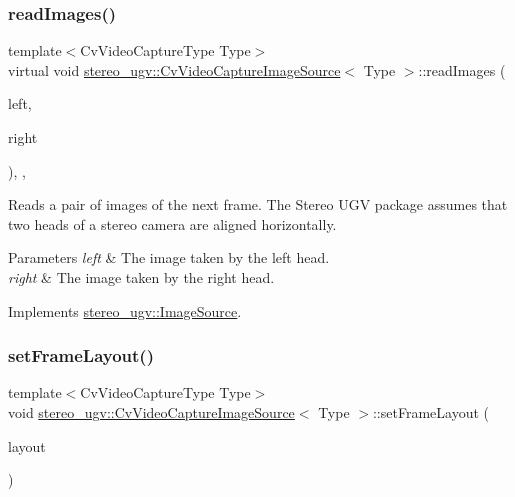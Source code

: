 \subsubsection{\texorpdfstring{read\+Images()}{readImages()}}
{\footnotesize\ttfamily template$<$Cv\+Video\+Capture\+Type Type$>$ \\
virtual void \hyperlink{classstereo__ugv_1_1CvVideoCaptureImageSource}{stereo\+\_\+ugv\+::\+Cv\+Video\+Capture\+Image\+Source}$<$ Type $>$\+::read\+Images (\begin{DoxyParamCaption}\item[{cv\+::\+Mat $\ast$}]{left,  }\item[{cv\+::\+Mat $\ast$}]{right }\end{DoxyParamCaption})\hspace{0.3cm}{\ttfamily [inline]}, {\ttfamily [override]}, {\ttfamily [virtual]}}



Reads a pair of images of the next frame. The Stereo U\+GV package assumes that two heads of a stereo camera are aligned horizontally. 


\begin{DoxyParams}{Parameters}
{\em left} & The image taken by the left head. \\
\hline
{\em right} & The image taken by the right head. \\
\hline
\end{DoxyParams}


Implements \hyperlink{classstereo__ugv_1_1ImageSource_a3d87f7b09cd8889fcbee3efb29a0c39c}{stereo\+\_\+ugv\+::\+Image\+Source}.

\mbox{\label{classstereo__ugv_1_1CvVideoCaptureImageSource_a70f8c34dd228771d141fee7027cbc211}} 
\subsubsection{\texorpdfstring{set\+Frame\+Layout()}{setFrameLayout()}}
{\footnotesize\ttfamily template$<$Cv\+Video\+Capture\+Type Type$>$ \\
void \hyperlink{classstereo__ugv_1_1CvVideoCaptureImageSource}{stereo\+\_\+ugv\+::\+Cv\+Video\+Capture\+Image\+Source}$<$ Type $>$\+::set\+Frame\+Layout (\begin{DoxyParamCaption}\item[{std\+::unique\+\_\+ptr$<$ \hyperlink{classstereo__ugv_1_1FrameLayout}{Frame\+Layout} $>$ \&\&}]{layout }\end{DoxyParamCaption})\hspace{0.3cm}{\ttfamily [inline]}}




